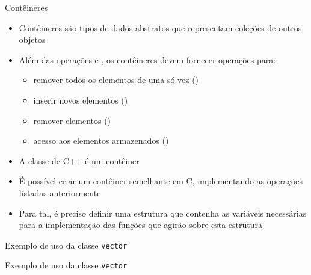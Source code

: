 \begin{frame}[fragile]{Contêineres}

	\begin{itemize}

		\item Contêineres são tipos de dados abstratos que representam coleções de outros objetos

		\item Além das operações  e , os contêineres devem fornecer 
        operações para:
		\begin{itemize}
			\item remover todos os elementos de uma só vez ()
			\item inserir novos elementos ()
			\item remover elementos ()
			\item acesso aos elementos armazenados ()
		\end{itemize}

		\item A classe  de C++ é um contêiner

		\item É possível criar um contêiner semelhante em C, implementando as operações listadas 
		anteriormente

		\item Para tal, é preciso definir uma estrutura que contenha as variáveis necessárias para 
        a implementação das funções que agirão sobre esta estrutura
	\end{itemize}

\end{frame}

\begin{frame}[fragile]{Exemplo de uso da classe \texttt{vector}}
\end{frame}

\begin{frame}[fragile]{Exemplo de uso da classe \texttt{vector}}
\end{frame}
